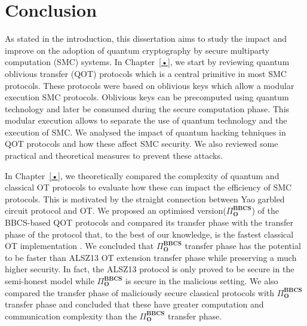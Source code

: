 


%

\chapter{Conclusion}

As stated in the introduction, this dissertation aims to study the impact and improve on the adoption of quantum cryptography by secure multiparty computation (SMC) systems. In Chapter~\ref{•}, we start by reviewing quantum oblivious transfer (QOT) protocols which is a central primitive in most SMC protocols. These protocols were based on oblivious keys which allow a modular execution SMC protocols. Oblivious keys can be precomputed using quantum technology and later be consumed during the secure computation phase. This modular execution allows to separate the use of quantum technology and the execution of SMC. We analysed the impact of quantum hacking tehniques in QOT protocols and how these affect SMC security. We also reviewed some practical and theoretical measures to prevent these attacks.

In Chapter~\ref{•}, we theoretically compared the complexity of quantum and classical OT protocols to evaluate how these can impact the efficiency of SMC protocols. This is motivated by the straight connection between Yao garbled circuit protocol and OT. We proposed an optimised version($\Pi^{\textbf{BBCS}}_{\textbf{O}}$) of the BBCS-based QOT protocols and compared its transfer phase with the transfer phase of the protocol that, to the best of our knowledge, is the fastest classical OT implementation \cite{ALSZ13}. We concluded that $\Pi^{\textbf{BBCS}}_{\textbf{O}}$ transfer phase has the potential to be faster than ALSZ13 OT extension transfer phase while preserving a much higher security. In fact, the ALSZ13 protocol is only proved to be secure in the semi-honest model while $\Pi^{\textbf{BBCS}}_{\textbf{O}}$ is secure in the malicious setting. 
We also compared the transfer phase of maliciously secure classical protocols \cite{ALSZ15, KOS15} with $\Pi^{\textbf{BBCS}}_{\textbf{O}}$ transfer phase and concluded that these have greater computation and communication complexity than the $\Pi^{\textbf{BBCS}}_{\textbf{O}}$ transfer phase. 

